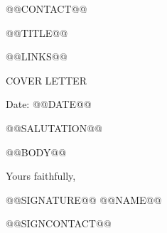 \documentclass[11pt,a4paper]{article}
\begin{document}
\begin{center}
  \begin{minipage}[b]{0.24\textwidth}
    \raggedright\small @@CONTACT@@
  \end{minipage}%
  \begin{minipage}[b]{0.50\textwidth}
    \par\vspace{0.1cm}
    {\color{UI_blue}\Large @@TITLE@@}
  \end{minipage}%
  \begin{minipage}[b]{0.24\textwidth}
    \raggedleft\small @@LINKS@@
  \end{minipage}
  \par\vspace{0.15cm}{\color{UI_blue}\hrulefill}
\end{center}
\setlength{\parindent}{0pt}
\setlength{\parskip}{@@PARSKIP@@pt}
\begin{center}{\color{UI_blue}\Large COVER LETTER}\end{center}
Date: @@DATE@@\par
@@SALUTATION@@\par
@@BODY@@
\par\vspace{0.15cm}
\begin{minipage}{\textwidth}
Yours faithfully,\par\vspace{0.1cm}
@@SIGNATURE@@
@@NAME@@\par
@@SIGNCONTACT@@
\end{minipage}
\end{document}
